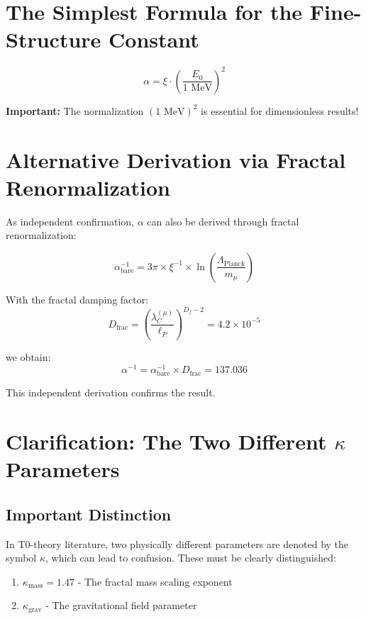\section*{The Simplest Formula for the Fine-Structure Constant}

\[
\boxed{\alpha = \xi \cdot \left(\frac{E_0}{1 \text{ MeV}}\right)^2}
\]
\begin{tcolorbox}[colback=red!5!white,colframe=red!75!black]
	\textbf{Important:} The normalization $(1 \text{ MeV})^2$ is essential for dimensionless results!
\end{tcolorbox}	
	\section{Alternative Derivation via Fractal Renormalization}
	
	As independent confirmation, $\alpha$ can also be derived through fractal renormalization:
	
	\begin{equation}
		\alpha_{\text{bare}}^{-1} = 3\pi \times \xi^{-1} \times \ln\left(\frac{\Lambda_{\text{Planck}}}{m_\mu}\right)
	\end{equation}
	
	With the fractal damping factor:
	\begin{equation}
		D_{\text{frac}} = \left(\frac{\lambda_C^{(\mu)}}{\ell_P}\right)^{D_f-2} = 4.2 \times 10^{-5}
	\end{equation}
	
	we obtain:
	\begin{equation}
		\alpha^{-1} = \alpha_{\text{bare}}^{-1} \times D_{\text{frac}} = 137.036
	\end{equation}
	
	This independent derivation confirms the result.
	
	\section{Clarification: The Two Different $\kappa$ Parameters}
	
	\subsection{Important Distinction}
	
	In T0-theory literature, two physically different parameters are denoted by the symbol $\kappa$, which can lead to confusion. These must be clearly distinguished:
	
	\begin{enumerate}
		\item $\kappa_{\text{mass}} = 1.47$ - The fractal mass scaling exponent
		\item $\kappa_{\text{grav}}$ - The gravitational field parameter
	\end{enumerate}
	

